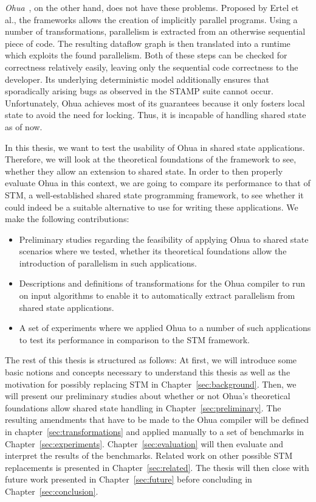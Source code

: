 \emph{Ohua}~\cite{ertel2015ohua}, on the other hand, does not have these problems.
Proposed by Ertel et al., the frameworks allows the creation of implicitly parallel programs.
Using a number of transformations, parallelism is extracted from an otherwise sequential piece of code.
The resulting dataflow graph is then translated into a runtime which exploits the found parallelism.
Both of these steps can be checked for correctness relatively easily, leaving only the sequential code correctness to the developer.
Its underlying deterministic model additionally ensures that sporadically arising bugs as observed in the STAMP suite cannot occur.
Unfortunately, Ohua achieves most of its guarantees because it only fosters local state to avoid the need for locking.
Thus, it is incapable of handling shared state as of now.

In this thesis, we want to test the usability of Ohua in shared state applications.
Therefore, we will look at the theoretical foundations of the framework to see, whether they allow an extension to shared state.
In order to then properly evaluate Ohua in this context, we are going to compare its performance to that of STM, a well-established shared state programming framework, to see whether it could indeed be a suitable alternative to use for writing these applications.
We make the following contributions:

\begin{itemize}
    \item Preliminary studies regarding the feasibility of applying Ohua to shared state scenarios where we tested, whether its theoretical foundations allow the introduction of parallelism in such applications.
    \item Descriptions and definitions of transformations for the Ohua compiler to run on input algorithms to enable it to automatically extract parallelism from shared state applications.
    \item A set of experiments where we applied Ohua to a number of such applications to test its performance in comparison to the STM framework.
\end{itemize}

The rest of this thesis is structured as follows:
At first, we will introduce some basic notions and concepts necessary to understand this thesis as well as the motivation for possibly replacing STM in Chapter~\ref{sec:background}.
Then, we will present our preliminary studies about whether or not Ohua's theoretical foundations allow shared state handling in Chapter~\ref{sec:preliminary}.
The resulting amendments that have to be made to the Ohua compiler will be defined in chapter~\ref{sec:transformations} and applied manually to a set of benchmarks in Chapter~\ref{sec:experiments}.
Chapter~\ref{sec:evaluation} will then evaluate and interpret the results of the benchmarks.
Related work on other possible STM replacements is presented in Chapter~\ref{sec:related}.
The thesis will then close with future work presented in Chapter~\ref{sec:future} before concluding in Chapter~\ref{sec:conclusion}.
